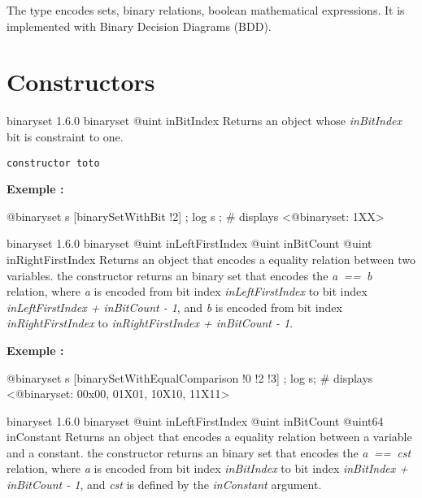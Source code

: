 

The  type encodes sets, binary relations, boolean mathematical expressions. It is implemented with Binary Decision Diagrams (BDD).


\section{Constructors}

{binaryset}
{1.6.0}
{binaryset}
{@uint inBitIndex}
{Returns an  object whose \emph{inBitIndex} bit is constraint to one.}
{}

\begin{lstlisting}[language=galgas]
  constructor toto
\end{lstlisting}


\textbf{Exemple :}
\begin{galgascode}
@binaryset s [binarySetWithBit !2] ;
log s ; # displays <@binaryset: 1XX>
\end{galgascode}





{binaryset}
{1.6.0}
{binaryset}
{@uint inLeftFirstIndex}
{@uint inBitCount}
{@uint inRightFirstIndex}
{Returns an  object that encodes a equality relation between two variables.}
{the constructor returns an binary set that encodes the \emph{a~==~b} relation, where \emph{a} is encoded from bit index \emph{inLeftFirstIndex} to bit index \emph{inLeftFirstIndex  + inBitCount - 1}, and \emph{b} is encoded from bit index \emph{inRightFirstIndex} to \emph{inRightFirstIndex + inBitCount - 1}.}

\textbf{Exemple :}
\begin{galgascode}
@binaryset s [binarySetWithEqualComparison !0 !2 !3] ;
log s; # displays <@binaryset: 00x00, 01X01, 10X10, 11X11>
\end{galgascode}





{binaryset}
{1.6.0}
{binaryset}
{@uint inLeftFirstIndex}
{@uint inBitCount}
{@uint64 inConstant}
{Returns an  object that encodes a equality relation between a variable and a constant.}
{the constructor returns an binary set that encodes the \emph{a~==~cst} relation, where \emph {a} is encoded from bit index \emph{inBitIndex} to bit index \emph{inBitIndex  + inBitCount - 1}, and \emph{cst} is defined by the \emph{inConstant} argument.}

